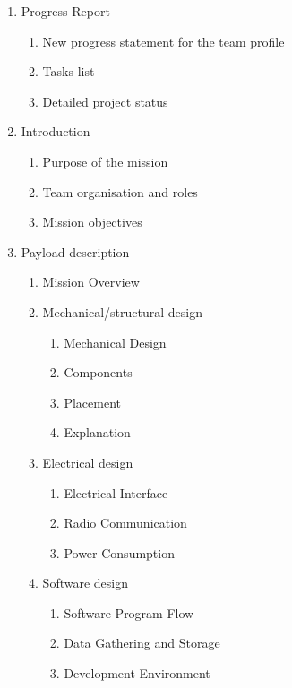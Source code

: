 \begin{enumerate}[label=\arabic*.,leftmargin=*]
    \item Progress Report - \done
    \begin{enumerate}[label=\arabic*.]
        \item New progress statement for the team profile
        \item Tasks list
        \item Detailed project status
    \end{enumerate}
    \item Introduction - \done
    \begin{enumerate}[label=\arabic*.]
        \item Purpose of the mission
        \item Team organisation and roles
        \item Mission objectives
    \end{enumerate}
    \item Payload description - \done
    \begin{enumerate}[label=\arabic*.]
        \item Mission Overview
        \item Mechanical/structural design
        \begin{enumerate}[label=\arabic*.]
            \item Mechanical Design
            \item Components
            \item Placement
            \item Explanation
        \end{enumerate}
        \item Electrical design
        \begin{enumerate}[label=\arabic*.]
            \item Electrical Interface
            \item Radio Communication
            \item Power Consumption
        \end{enumerate}
        \item Software design
        \begin{enumerate}[label=\arabic*.]
            \item Software Program Flow
            \item Data Gathering and Storage
            \item Development Environment
        \end{enumerate}

\end{enumerate}
\end{enumerate}
